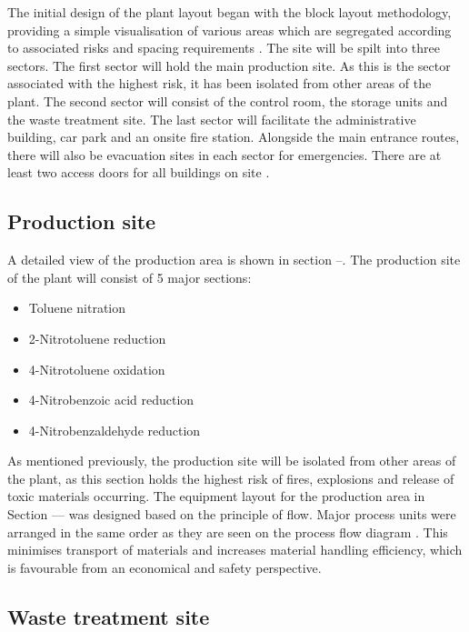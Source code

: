 The initial design of the plant layout began with the block layout methodology, providing a simple visualisation of various areas which are segregated according to associated risks and spacing requirements \cite{center_for_chemical_process_safety_site_2010}. The site will be spilt into three sectors. The first sector will hold the main production site. As this is the sector associated with the highest risk, it has been isolated from other areas of the plant. The second sector will consist of the control room, the storage units and the waste treatment site. The last sector will facilitate the administrative building, car park and an onsite fire station. Alongside the main entrance routes, there will also be evacuation sites in each sector for emergencies. There are at least two access doors for all buildings on site \cite{aiche_dows_1994}. 




\subsection{Production site}

A detailed view of the production area is shown in section --. The production site of the plant will consist of 5 major sections:

\begin{itemize}
    \item Toluene nitration
    \item 2-Nitrotoluene reduction 
    \item 4-Nitrotoluene oxidation 
    \item 4-Nitrobenzoic acid reduction 
    \item 4-Nitrobenzaldehyde reduction 
\end{itemize}

As mentioned previously, the production site will be isolated from other areas of the plant, as this section holds the highest risk of fires, explosions  and release of toxic materials occurring. The equipment layout for the production area in Section --- was designed based on the principle of flow. Major process units were arranged in the same order as they are seen on the process flow diagram \cite{mannan_lees_2012}. This minimises transport of materials and increases material handling efficiency, which is favourable from an economical and safety perspective.  

\subsection{Waste treatment site}

